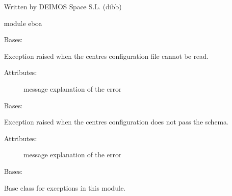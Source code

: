 Written by DEIMOS Space S.L. (dibb)

module eboa

\begin{fulllineitems}
\label{\detokenize{s2boa.ingestions:s2boa.ingestions.errors.CentresConfigCannotBeRead}}
Bases: {\hyperref[\detokenize{s2boa.ingestions:s2boa.ingestions.errors.Error}]{}}

Exception raised when the centres configuration file cannot be read.
\begin{description}
\item[{Attributes:}] \leavevmode
message \textendash{} explanation of the error

\end{description}

\end{fulllineitems}


\begin{fulllineitems}
\label{\detokenize{s2boa.ingestions:s2boa.ingestions.errors.CentresConfigDoesNotPassSchema}}
Bases: {\hyperref[\detokenize{s2boa.ingestions:s2boa.ingestions.errors.Error}]{}}

Exception raised when the centres configuration does not pass the schema.
\begin{description}
\item[{Attributes:}] \leavevmode
message \textendash{} explanation of the error

\end{description}

\end{fulllineitems}


\begin{fulllineitems}
\label{\detokenize{s2boa.ingestions:s2boa.ingestions.errors.Error}}
Bases: 

Base class for exceptions in this module.

\end{fulllineitems}




